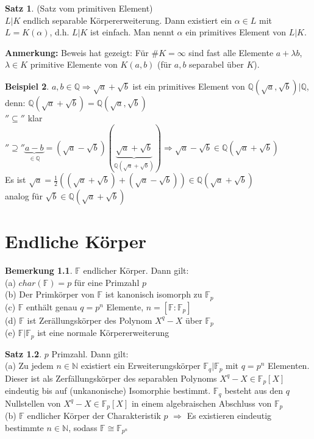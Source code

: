 \documentclass[10pt,a4paper,numbers=endperiod]{scrreprt}
\theoremstyle{definition}
\newtheorem{satz}{Satz}[section]
\newtheorem{bem}[satz]{Bemerkung}
\newtheorem{bsp}[satz]{Beispiel}
\def\QQ{{\mathbb Q}}
\def\NN{{\mathbb N}}
\def\FF{{\mathbb F}}
\begin{document}
\begin{satz}
	(Satz vom primitiven Element)\\
	$L|K$ endlich separable Körpererweiterung. Dann existiert ein $\alpha \in L$ mit $L = K(\alpha)$, d.h. $L|K$ ist einfach. Man nennt $\alpha$ ein primitives Element von $L|K$.
\end{satz}

\textbf{Anmerkung:} Beweis hat gezeigt: Für $\# K = \infty$ sind fast alle Elemente $a + \lambda b$, $\lambda \in K$ primitive Elemente von $K(a,b)$ (für $a, b$ separabel über $K$). 

\begin{bsp}
	$a, b \in \QQ \Rightarrow \sqrt{a} + \sqrt{b}$ ist ein primitives Element von $\QQ(\sqrt{a}, \sqrt{b})|\QQ$, denn: $\QQ(\sqrt{a} + \sqrt{b}) = \QQ(\sqrt{a}, \sqrt{b})$\\
	$''\subseteq''$ klar\\
	$''\supseteq'' \underbrace{a-b}_{\in \QQ} = (\sqrt{a}-\sqrt{b})(\underbrace{\sqrt{a}+\sqrt{b}}_{\QQ(\sqrt{a} + \sqrt{b})}) \Rightarrow \sqrt{a} - \sqrt{b} \in \QQ(\sqrt{a}+\sqrt{b})$\\
	Es ist $\sqrt{a} = \frac{1}{2}((\sqrt{a}+\sqrt{b})+(\sqrt{a} - \sqrt{b})) \in \QQ(\sqrt{a} + \sqrt{b})$\\
	analog für $\sqrt{b} \in \QQ(\sqrt{a} + \sqrt{b})$
\end{bsp}

\chapter{Endliche Körper}

\begin{bem}
	$\FF$ endlicher Körper. Dann gilt:\\
	(a) $char(\FF) = p$ für eine Primzahl $p$\\
	(b) Der Primkörper von $\FF$ ist kanonisch isomorph zu $\FF_p$\\
	(c) $\FF$ enthält genau $q = p^n$ Elemente, $n = [\FF: \FF_p]$\\
	(d) $\FF$ ist Zerällungskörper des Polynom $X^q - X$ über $\FF_p$\\
	(e) $\FF|\FF_p$ ist eine normale Körpererweiterung
\end{bem}

\begin{satz}
	$p$ Primzahl. Dann gilt:\\
	(a) Zu jedem $n \in \NN$ existiert ein Erweiterungskörper $\FF_q|\FF_p$ mit $q = p^n$ Elementen. Dieser ist als Zerfällungskörper des separablen Polynoms $X^q - X \in \FF_p[X]$ eindeutig bis auf (unkanonische) Isomorphie bestimmt. $\FF_q$ besteht aus den $q$ Nullstellen von $X^q - X \in \FF_p[X]$ in einem algebraischen Abschluss von $\FF_p$\\
	(b) $\FF$ endlicher Körper der Charakteristik $p$ $\Rightarrow$ Es existieren eindeutig bestimmte $n \in \NN$, sodass $\FF \cong \FF_{p^n}$ 
\end{satz}
\end{document}
